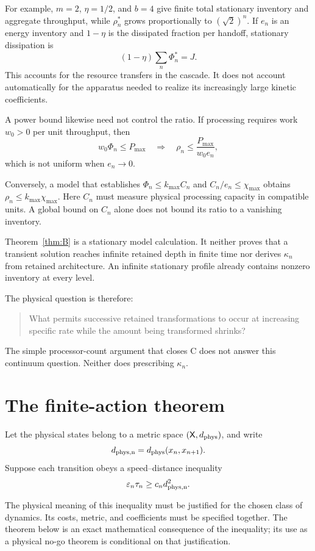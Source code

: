 \documentclass[11pt,a4paper]{article}
\theoremstyle{definition}
\numberwithin{equation}{section}
\begin{document}
For example, $m=2$, $\eta=1/2$, and $b=4$ give finite total
stationary inventory and aggregate throughput, while
$\rho_n^*$ grows proportionally to $(\sqrt2)^n$.
If $e_n$ is an energy inventory and $1-\eta$ is the dissipated
fraction per handoff, stationary dissipation is
\[
(1-\eta)\sum_n\Phi_n^*=J.
\]
This accounts for the resource transfers in the cascade.
It does not account automatically for the apparatus needed to
realize its increasingly large kinetic coefficients.

A power bound likewise need not control the ratio. If processing
requires work $w_0>0$ per unit throughput, then
\[
w_0\Phi_n\le P_{\max}
\quad\Longrightarrow\quad
\rho_n\le\frac{P_{\max}}{w_0e_n},
\]
which is not uniform when $e_n\to0$.

Conversely, a model that establishes
$\Phi_n\le k_{\max}C_n$ and
$C_n/e_n\le\chi_{\max}$ obtains
$\rho_n\le k_{\max}\chi_{\max}$.
Here $C_n$ must measure physical processing capacity in compatible
units. A global bound on $C_n$ alone does not bound its ratio to
a vanishing inventory.

Theorem~\ref{thm:B} is a stationary model calculation. It neither
proves that a transient solution reaches infinite retained depth
in finite time nor derives $\kappa_n$ from retained architecture.
An infinite stationary profile already contains nonzero inventory
at every level.

The physical question is therefore:
\begin{quote}
What permits successive retained transformations to occur at
increasing specific rate while the amount being transformed shrinks?
\end{quote}
The simple processor-count argument that closes C does not answer
this continuum question. Neither does prescribing $\kappa_n$.


\section{The finite-action theorem}

Let the physical states belong to a metric space
$(\mathsf X,d_{\rm phys})$, and write
\[
d_{\rm phys,n}=d_{\rm phys}(x_n,x_{n+1}).
\]
Suppose each transition obeys a speed--distance inequality
\begin{equation}
\varepsilon_n\tau_n
\ge c_n d_{\rm phys,n}^2.
\label{eq:action-law}
\end{equation}

The physical meaning of this inequality must be justified for the
chosen class of dynamics. Its costs, metric, and coefficients must
be specified together. The theorem below is an exact mathematical
consequence of the inequality; its use as a physical no-go theorem
is conditional on that justification.
\end{document}
